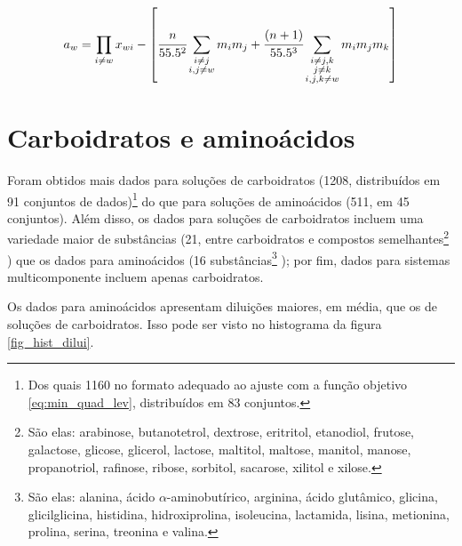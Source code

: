 \documentclass[
	12pt,				%
	openright,
	twoside,
	a4paper,			%
	english,			%
	french,				%
	spanish,			%
	brazil				%
	]{abntex2}
\begin{document}
\begin{equation}
	\label{eq_caurie_raoult}
	a_w = \prod_{i \neq w}x_{wi}-\left[\cfrac{n}%
	{55.5^2}\sum_{\substack{i \neq j \\ i,j \neq w}}%
	m_im_j + \cfrac{(n+1)}{55.5^3}\sum_{%
	\substack{i\neq j,k \\ j \neq k \\  i,j,k \neq w}}%
	m_im_jm_k\right]
\end{equation}

\section{Carboidratos e aminoácidos}

Foram obtidos mais dados para soluções de carboidratos (1208, distribuídos em
91 conjuntos de dados)\footnote{%
	Dos quais 1160 no formato adequado ao ajuste com a função objetivo
	\ref{eq:min_quad_lev}, distribuídos em 83 conjuntos.
}
do que para soluções de aminoácidos (511, em 45 conjuntos). Além disso, os dados
para soluções de carboidratos incluem uma variedade maior de substâncias (21,
entre carboidratos e compostos semelhantes\footnote{%
	São elas: arabinose, butanotetrol, dextrose, eritritol, etanodiol,
	frutose, galactose, glicose, glicerol, lactose, maltitol, maltose,
	manitol, manose, propanotriol, rafinose, ribose, sorbitol, sacarose,
	xilitol e xilose.
}
) que os dados para aminoácidos (16 substâncias\footnote{%
	São elas: alanina, ácido $\alpha$-aminobutírico, arginina, ácido
	glutâmico, glicina, glicilglicina, histidina, hidroxiprolina,
	isoleucina, lactamida, lisina, metionina, prolina, serina,
	treonina e valina.
}
); por fim, dados para sistemas multicomponente incluem apenas carboidratos.

Os dados para aminoácidos apresentam diluições maiores, em média, que os de
soluções de carboidratos. Isso pode ser visto no histograma da figura
\ref{fig_hist_dilui}.
\end{document}
